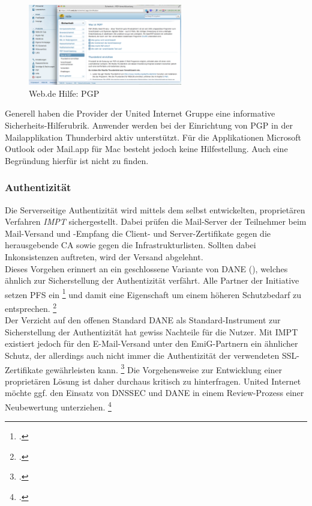\documentclass  [paper=a4,
				fontsize=12pt,
				listof=totoc,
				bibliography=totoc
				]{scrreprt}
\begin{document}
			\begin{figure} %
				\vspace{-12pt}
				\centering
				\includegraphics[width=0.6\textwidth]{images/Web-de_Hilfe_PGP}
				\caption[Web.de PGP]{Web.de Hilfe: PGP} 
				\label{fig:Web-de_Hilfe_PGP} %
				\vspace{-24pt}
			\end{figure}
			Generell haben die Provider der United Internet Gruppe eine informative Sicherheits-Hilferubrik.
			Anwender werden bei der Einrichtung von \ac{PGP} in der Mailapplikation Thunderbird aktiv unterstützt.
			Für die Applikationen Microsoft Outlook oder Mail.app für Mac besteht jedoch keine Hilfestellung.
			Auch eine Begründung hierfür ist nicht zu finden.
		\subsubsection{Authentizität}
		\label{subsubsec:emig-auth}	
			Die Serverseitige Authentizität wird mittels dem selbst entwickelten, proprietären Verfahren \textit{\ac{IMPT}} sichergestellt. 
			Dabei prüfen die Mail-Server der Teilnehmer beim Mail-Versand und -Empfang die Client- und Server-Zertifikate gegen die herausgebende \ac{CA} sowie gegen die Infrastrukturlisten.
			Sollten dabei Inkonsistenzen auftreten, wird der Versand abgelehnt.\\
			Dieses Vorgehen erinnert an ein geschlossene Variante von \ac{DANE} (), welches ähnlich zur Sicherstellung der Authentizität verfährt.
			Alle Partner der Initiative setzen \ac{PFS} ein
			\footcite[Vgl.][]{Zivadino14-1}
			und damit eine Eigenschaft um einem höheren Schutzbedarf zu entsprechen.
			\footcite[Vgl.][]{Zivadino14-2} 
			\medskip\\
			Der Verzicht auf den offenen Standard \ac{DANE} als Standard-Instrument zur Sicherstellung der Authentizität hat gewiss Nachteile für die Nutzer. 
			Mit \acl{IMPT} existiert jedoch für den E-Mail-Versand unter den \ac{EmiG}-Partnern ein ähnlicher Schutz, der allerdings auch nicht immer die Authentizität der verwendeten \ac{SSL}-Zertifikate gewährleisten kann.
			\footcite[Vgl.][]{Zivadino14-1}
			Die Vorgehensweise zur Entwicklung einer proprietären Lösung ist daher durchaus kritisch zu hinterfragen. 
			United Internet möchte ggf. den Einsatz von \ac{DNSSEC} und \ac{DANE} in einem Review-Prozess einer Neubewertung unterziehen.
			\footcite[Vgl.][]{Zivadino14-2}
\end{document}
